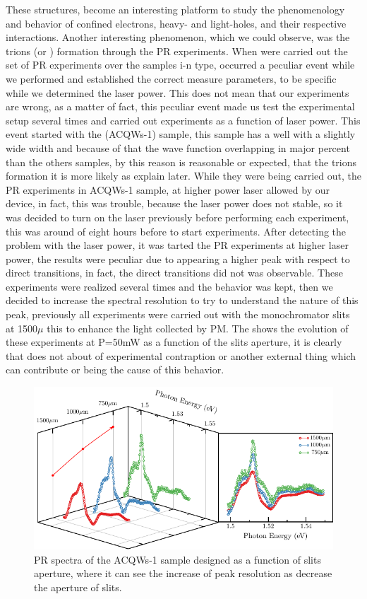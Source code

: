 These structures, become an interesting platform to study the phenomenology and behavior of confined electrons, heavy- and light-holes, and their respective interactions. Another interesting phenomenon, which we could observe, was the trions (\xp or \xm) formation through the PR experiments. When were carried out the set of PR experiments over the samples i-n type, occurred a peculiar event while we performed and established the correct measure parameters, to be specific while we determined the laser power. This does not mean that our experiments are wrong, as a matter of fact,  this peculiar event made us test the experimental setup several times and carried out experiments as a function of laser power. This event started with the  (ACQWs-1) sample, this sample has a well with a slightly wide width and because of that the wave function overlapping in major percent than the others samples, by this reason is reasonable or expected, that the trions formation it is more likely as explain later.  While they were being carried out, the PR experiments in ACQWs-1 sample, at higher power laser allowed by our device, in fact, this was trouble, because the laser power does not stable, so it was decided to turn on the laser  previously  before performing each experiment, this was around of eight  hours before to start experiments. After detecting the problem with the laser power, it was tarted the PR experiments at higher laser power, the results were peculiar due to appearing a higher peak with respect to direct transitions, in fact, the direct transitions did not was observable. These experiments were realized several times and the behavior was kept, then we decided to increase the spectral resolution to try to understand the nature of this peak,  previously all experiments were carried out with the  monochromator slits at 1500$\mu$ this to enhance the light collected by PM. The  shows the evolution of these experiments at P=50mW as a function of the slits aperture, it is clearly that does not about of experimental contraption or another external thing which can contribute or being the cause of this behavior. 
\begin{figure}[h!]
	\centering
	\includegraphics[width=\textwidth]{../figures/chapter-3/pr-plots/build/pr-set5.pdf}
	\caption{PR spectra of the ACQWs-1 sample designed as a function of slits aperture, where it can see the increase of peak resolution as  decrease the aperture of slits.}
	\label{fig:chapter-3-PR-PLOT-SET5}
\end{figure}

